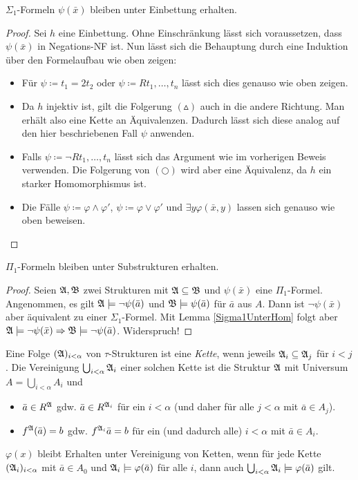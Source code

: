 \begin{lemma}
	$\Sigma_1$-Formeln $\psi(\bar{x})$ bleiben unter Einbettung erhalten.
\end{lemma}
\begin{proof}
	Sei $h$ eine Einbettung. Ohne Einschränkung lässt sich voraussetzen, dass $\psi(\bar{x})$ in Negations-NF ist. Nun lässt sich die Behauptung durch eine Induktion über den Formelaufbau wie oben zeigen:
	\begin{itemize}
		\item Für $\psi\coloneqq t_1=2t_2$ oder $\psi\coloneqq R t_1,\dots,t_n$ lässt sich dies genauso wie oben zeigen.
		\item Da $h$ injektiv ist, gilt die Folgerung $(\vartriangle)$ auch in die andere Richtung. Man erhält also eine Kette an Äquivalenzen. Dadurch lässt sich diese analog auf den hier beschriebenen Fall $\psi$ anwenden.
		\item Falls $\psi\coloneqq\neg R t_1,\dots,t_n$ lässt sich das Argument wie im vorherigen Beweis verwenden. Die Folgerung von $(\bigcirc)$ wird aber eine Äquivalenz, da $h$ ein starker Homomorphismus ist.
		\item Die Fälle $\psi\coloneqq\varphi\land\varphi'$, $\psi\coloneqq\varphi\lor\varphi'$ und $\exists y \varphi(\bar{x},y)$ lassen sich genauso wie oben beweisen.
	\end{itemize}
\end{proof}

\begin{lemma}
	$\Pi_1$-Formeln bleiben unter Substrukturen erhalten.
	\label{Pi1UnterSubstruk}
\end{lemma}
\begin{proof}
	Seien $\mathfrak{A},\mathfrak{B}$ zwei Strukturen mit $\mathfrak{A}\subseteq\mathfrak{B}$ und $\psi(\bar{x})$ eine $\Pi_1$-Formel. Angenommen, es gilt $\mathfrak{A}\models\neg\psi(\bar{a})$ und $\mathfrak{B}\models\psi(\bar{a})$ für $\bar{a}$ aus $A$. Dann ist $\neg\psi(\bar{x})$ aber äquivalent zu einer $\Sigma_1$-Formel. Mit Lemma \ref{Sigma1UnterHom} folgt aber $\mathfrak{A}\models\neg\psi(\bar{x})\Rightarrow\mathfrak{B}\models\neg\psi(\bar{a})$. Widerspruch!
\end{proof}

\begin{definition}
	Eine Folge $(\mathfrak{A})_{i<\alpha}$ von $\tau$-Strukturen ist eine \textit{Kette}, wenn jeweils $\mathfrak{A}_i\subseteq\mathfrak{A}_j$ für $i<j$. Die Vereinigung $\bigcup_{i<\alpha}\mathfrak{A}_i$ einer solchen Kette ist die Struktur $\mathfrak{A}$ mit Universum $A=\bigcup_{i<\alpha}A_i$ und
	\begin{itemize}
		\item $\bar{a}\in R^{\mathfrak{A}}$ gdw. $\bar{a}\in R^{\mathfrak{A}_i}$ für ein $i<\alpha$ (und daher für alle $j<\alpha$ mit $\bar{a}\in A_j$).
		\item $f^{\mathfrak{A}}(\bar{a})=b$ gdw. $f^{\mathfrak{A}_i}\bar{a}=b$ für ein (und dadurch alle) $i<\alpha$ mit $\bar{a}\in A_i$.
	\end{itemize}
\end{definition}
$\varphi(x)$ bleibt Erhalten unter Vereinigung von Ketten, wenn für jede Kette $(\mathfrak{A}_i)_{i<\alpha}$ mit $\bar{a}\in A_0$ und $\mathfrak{A}_i\models\varphi(\bar{a})$ für alle $i$, dann auch $\bigcup_{i<\alpha}\mathfrak{A}_i \models \varphi(\bar{a})$ gilt.

